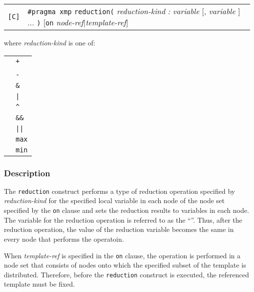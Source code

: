 \begin{tabular}{ll}
\verb![C]! & \verb|#pragma xmp| {\tt reduction(} {\it reduction-kind} {\it
  :} {\it variable} [, {\it variable} ] ... {\tt )} [{\tt on} {\it
      node-ref}$\vert${\it template-ref}] \\
\end{tabular}

where {\it reduction-kind} is one of:

\begin{tabular}{ll}
 \hspace{0.5cm} & {\tt +} \\
 & {\tt *} \\
 & {\tt -} \\
 & {\verb|&|} \\
 & {\tt |} \\
 & {\verb|^|} \\
 & {\verb|&&|} \\
 & {\tt ||} \\
 & {\tt max} \\
 & {\tt min} \\
\end{tabular}

\subsubsection*{Description}

The {\tt reduction} construct performs a type of
reduction operation specified by {\it reduction-kind} for the specified
local variable in each node of the node set specified by the {\tt on}
clause and sets the reduction results to variables in each node. The
variable for the reduction operation is referred to as the ``''. Thus, after the reduction operation, the value of the
reduction variable becomes the same in every node that performs the
operatoin.

When {\it template-ref} is specified in the {\tt on} clause, the operation
is performed in a node set that consists of nodes onto which the
specified subset of the template is distributed.
Therefore, before the {\tt reduction} construct is executed, the
referenced template must be fixed.
%
%

